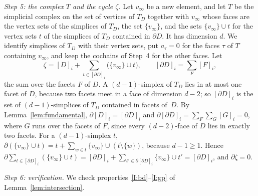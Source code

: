 \documentclass[11pt]{article}
\theoremstyle{definition}
\numberwithin{equation}{section}
\begin{document}
\emph{Step 5: the complex $T$ and the cycle $\zeta$.} Let $v_\infty$ be a new element, and let $T$ be the simplicial complex on the set of vertices of $T_D$ together with $v_\infty$ whose faces are the vertex sets of the simplices of $T_D$, the set $\{v_\infty\}$, and the sets $\{v_\infty\}\cup t$ for the vertex sets $t$ of the simplices of $T_D$ contained in $\partial D$. It has dimension $d$. We identify simplices of $T_D$ with their vertex sets, put $a_\tau=0$ for the faces $\tau$ of $T$ containing $v_\infty$, and keep the cochains of Step~4 for the other faces. Let
\begin{equation*}
 \zeta=[D]_i+\sum_{t\in[\partial D]_i}\bigl(\{v_\infty\}\cup t\bigr),\qquad [\partial D]_i=\sum_{F}[F]_i,
\end{equation*}
the sum over the facets $F$ of $D$. A $(d-1)$-simplex of $T_D$ lies in at most one facet of $D$, because two facets meet in a face of dimension $d-2$; so $[\partial D]_i$ is the set of $(d-1)$-simplices of $T_D$ contained in facets of~$D$. By Lemma~\ref{lem:fundamental}, $\partial[D]_i=[\partial D]_i$ and $\partial[\partial D]_i=\sum_F\sum_G[G]_i=0$, where $G$ runs over the facets of $F$, since every $(d-2)$-face of $D$ lies in exactly two facets. For a $(d-1)$-simplex $t$, $\partial(\{v_\infty\}\cup t)=t+\sum_{w\in t}\{v_\infty\}\cup(t\setminus\{w\})$, because $d-1\ge1$. Hence $\partial\sum_{t\in[\partial D]_i}(\{v_\infty\}\cup t)=[\partial D]_i+\sum_{t'\in\partial[\partial D]_i}\{v_\infty\}\cup t'=[\partial D]_i$, and $\partial\zeta=0$.

\emph{Step 6: verification.} We check properties~\ref{I:bd}--\ref{I:gp} of Lemma~\ref{lem:intersection}.
\end{document}
